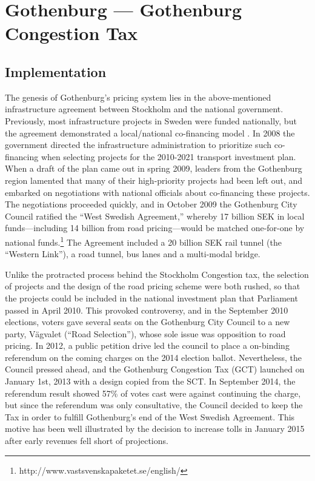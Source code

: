 \section{Gothenburg --- Gothenburg Congestion Tax}\label{sec:gothenburg}

\subsection{Implementation}

The genesis of Gothenburg's pricing system lies in the above-mentioned infrastructure agreement between Stockholm and the national government. Previously, most infrastructure projects in Sweden were funded nationally, but the agreement demonstrated a local/national co-financing model \citep{Borjesson2015,Hysing2015b}. In 2008 the government directed the infrastructure administration to prioritize such co-financing when selecting projects for the 2010-2021 transport investment plan. When a draft of the plan came out in spring 2009, leaders from the Gothenburg region lamented that many of their high-priority projects had been left out, and embarked on negotiations with national officials about co-financing these projects. The negotiations proceeded quickly, and in October 2009 the Gothenburg City Council ratified the ``West Swedish Agreement,'' whereby 17 billion SEK in local funds---including 14 billion from road pricing---would be matched one-for-one by national funds.\footnote{http://www.vastsvenskapaketet.se/english/} The Agreement included a 20 billion SEK rail tunnel (the ``Western Link''), a road tunnel, bus lanes and a multi-modal bridge. 

Unlike the protracted process behind the Stockholm Congestion tax, the selection of projects and the design of the road pricing scheme were both rushed, so that the projects could be included in the national investment plan that Parliament passed in April 2010. This provoked controversy, and in the September 2010 elections, voters gave several seats on the Gothenburg City Council to a new party, Vägvalet (``Road Selection''), whose sole issue was opposition to road pricing. In 2012, a public petition drive led the council to  place a on-binding referendum on the coming charges on the 2014 election ballot. Nevertheless, the Council pressed ahead, and the Gothenburg Congestion Tax (GCT) launched on January 1st, 2013 with a design copied from the SCT. In September 2014, the referendum result showed 57\% of votes cast were against continuing the charge, but since the referendum was only consultative, the Council decided to keep the Tax in order to fulfill Gothenburg's end of the West Swedish Agreement. This motive has been well illustrated by the decision to increase tolls in January 2015 after early revenues fell short of projections.

